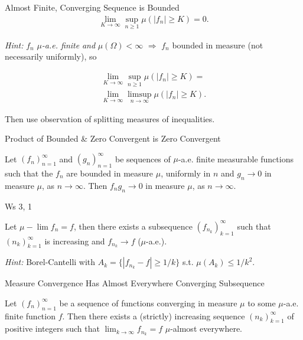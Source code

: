 \documentclass[10pt,landscape]{article}
\renewcommand{\leq}{\leqslant}
\renewcommand{\geq}{\geqslant}
\newcommand{\Hint}{\textit{Hint: }}
\begin{document}
\begin{multicols}{3}
\begin{exercise}{5.2}{Almost Finite, Converging Sequence is Bounded}
        \begin{align*}
            \lim_{K \to \infty} \sup_{n \geq 1} \mu(|f_n| \geq K) = 0.
        \end{align*}

    \Hint $f_n$ \emph{$\mu$-a.e. finite} \emph{and} $\mu(\Omega) < \infty$ $\Rightarrow$ $f_n$ bounded in measure (not necessarily uniformly), so

        \begin{align*}
            \lim_{K \to \infty} \sup_{n \geq 1} \mu(|f_n| \geq K) = \\ \lim_{K \to \infty} \limsup_{n \to \infty} \mu(|f_n| \geq K).
        \end{align*}

    Then use observation of splitting measures of inequalities.

\end{exercise}

\begin{exercise}{5.3}{Product of Bounded \& Zero Convergent is Zero Convergent}

    Let $(f_n)_{n=1}^{\infty}$ and $(g_n)_{n=1}^{\infty}$ be sequences of $\mu$-a.e. finite measurable functions such that the $f_n$ are bounded in measure $\mu$, uniformly in $n$ and $g_n \to 0$ in measure $\mu$, as $n \to \infty$. Then $f_ng_n \to 0$ in measure $\mu$, as $n \to \infty$.

\end{exercise}

\begin{exercise}{Ws 3, 1}{}

    Let $\mu-\lim f_n = f$, then there exists a subsequence $(f_{n_k})_{k=1}^{\infty}$ such that $(n_k)_{k=1}^{\infty}$ is increasing and $f_{n_k} \to f$ ($\mu$-a.e.).

    \Hint Borel-Cantelli with $A_k = \{ |f_{n_k} - f| \geq 1/k \}$ s.t. $\mu(A_k) \leq 1/k^2$.

\end{exercise}

\begin{theorem}{5.4}{Measure Convergence Has Almost Everywhere Converging Subsequence}

    Let $(f_n)_{n=1}^{\infty}$ be a sequence of functions converging in measure $\mu$ to some $\mu$-a.e. finite function $f$. Then there exists a (strictly) increasing sequence $(n_k)_{k=1}^{\infty}$ of positive integers such that $\lim_{k \to \infty} f_{n_k} = f$ $\mu$-almost everywhere.

\end{theorem}


\end{multicols}
\end{document}
